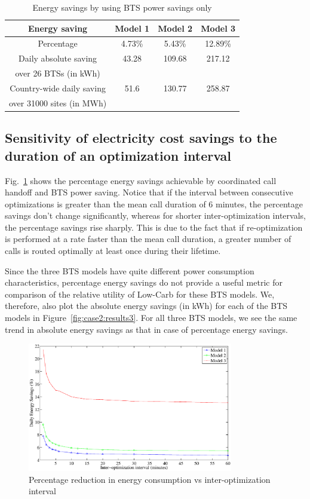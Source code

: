 \begin{table}
\centering
\begin{tabular}{|c|c|c|c|}
\hline Energy saving & Model 1 & Model 2 & Model 3 \\
\hline Percentage & 4.73\% & 5.43\% & 12.89\% \\
\hline Daily absolute saving & 43.28 & 109.68 & 217.12 \\
over 26 BTSs (in kWh) & \ & \ & \ \\
\hline Country-wide daily saving & 51.6 & 130.77 & 258.87\\
over 31000 sites (in MWh) & \ & \ & \ \\
\hline
\end{tabular}
\caption{Energy savings by using BTS power savings only}
\label{tab:psonly}
\end{table}

\subsection{Sensitivity of electricity cost savings to the duration of an optimization interval} Fig.~\ref{fig:case2:results2} shows the percentage energy savings achievable by coordinated call handoff and BTS power saving. Notice that if the interval between consecutive optimizations is greater than the mean call duration of 6 minutes, the percentage savings don't change significantly, whereas for shorter inter-optimization intervals, the percentage savings rise sharply. This is due to the fact that if re-optimization is performed at a rate faster than the mean call duration, a greater number of calls is routed optimally at least once during their lifetime. 

Since the three BTS models have quite different power consumption characteristics, percentage energy savings do not provide a useful metric for comparison of the relative utility of Low-Carb for these BTS models. We, therefore, also plot the absolute energy savings (in kWh) for each of the BTS models in Figure~\ref{fig:case2:results3}. For all three BTS models, we see the same trend in absolute energy savings as that in case of percentage energy savings. 

\begin{figure}
\centering
\includegraphics[width=0.8\textwidth]{pics/perc.savings.red-bl.eps}
\caption{Percentage reduction in energy consumption vs inter-optimization interval}
\label{fig:case2:results2}
\end{figure}

